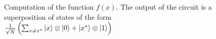 \begin{figure}
\centering



\caption{Computation of the function $f\left(x\right)$. The output of the circuit is
  a superposition of states of the form 
$\frac{1}{\sqrt{N}}\left(
 \sum_{x \ne x^{\ast}} \ket{x}\otimes\ket{0}
+ \left|x^{\ast}\right>\otimes\ket{1}
\right)$}
\label{figQuantCompGrover1}
\end{figure}

